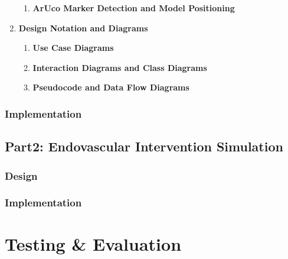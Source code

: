 \documentclass[12pt]{article}
\begin{document}
\begin{enumerate}
\begin{enumerate}
                  \item \textbf{ArUco Marker Detection and Model Positioning}
            \end{enumerate}


      \item \textbf{Design Notation and Diagrams}
            \begin{enumerate}
                  \item \textbf{Use Case Diagrams}

                  \item \textbf{Interaction Diagrams and Class Diagrams}

                  \item \textbf{Pseudocode and Data Flow Diagrams}
            \end{enumerate}
\end{enumerate}

\subsubsection{Implementation}

\subsection{Part2: Endovascular Intervention Simulation}

\subsubsection{Design}

\subsubsection{Implementation}


\section{Testing \& Evaluation}
\end{document}
